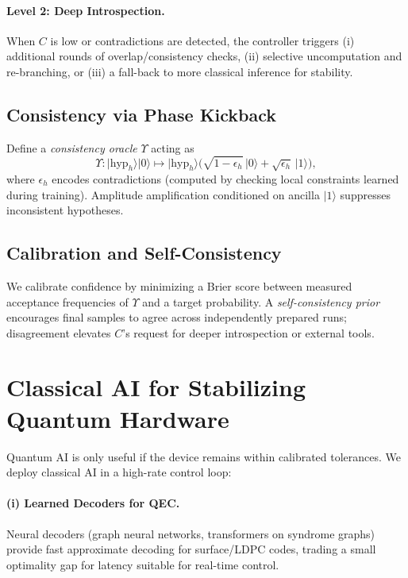 \documentclass[11pt]{article}
\newcommand{\qket}[1]{\lvert #1 \rangle}
\begin{document}
\paragraph{Level 2: Deep Introspection.}
When $C$ is low or contradictions are detected, the controller triggers (i) additional rounds of overlap/consistency checks, (ii) selective uncomputation and re-branching, or (iii) a fall-back to more classical inference for stability.

\subsection{Consistency via Phase Kickback}
Define a \emph{consistency oracle} $\Upsilon$ acting as
\begin{equation}
    \Upsilon: \qket{\text{hyp}_h}\qket{0} \mapsto 
    \qket{\text{hyp}_h}\Big(\sqrt{1-\epsilon_h}\,\qket{0} + \sqrt{\epsilon_h}\,\qket{1}\Big),
\end{equation}
where $\epsilon_h$ encodes contradictions (computed by checking local constraints learned during training).
Amplitude amplification conditioned on ancilla $\qket{1}$ suppresses inconsistent hypotheses.

\subsection{Calibration and Self-Consistency}
We calibrate confidence by minimizing a Brier score between measured acceptance frequencies of $\Upsilon$ and a target probability.
A \emph{self-consistency prior} encourages final samples to agree across independently prepared runs; disagreement elevates $C$'s request for deeper introspection or external tools.

\section{Classical AI for Stabilizing Quantum Hardware}

Quantum AI is only useful if the device remains within calibrated tolerances.
We deploy classical AI in a high-rate control loop:

\paragraph{(i) Learned Decoders for QEC.}
Neural decoders (graph neural networks, transformers on syndrome graphs) provide fast approximate decoding for surface/LDPC codes, trading a small optimality gap for latency suitable for real-time control.
\end{document}
